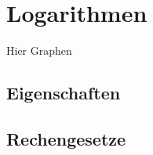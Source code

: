 \chapter{Logarithmen}

\begin{Definition}
\end{Definition}

Hier Graphen

	\section{Eigenschaften}	
	\section{Rechengesetze}
